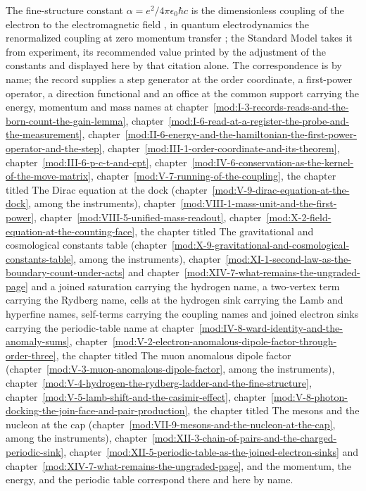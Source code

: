 \begin{chbridge}
The fine-structure constant $\alpha = e^{2}/4\pi\epsilon_{0}\hbar c$ is the dimensionless coupling of the electron to the electromagnetic field \cite{Sommerfeld1916}, in quantum electrodynamics the renormalized coupling at zero momentum transfer \cite{Peskin1995}; the Standard Model takes it from experiment, its recommended value printed by the adjustment of the constants \cite{Mohr2025} and displayed here by that citation alone. The correspondence is by name; the record supplies a step generator at the order coordinate, a first-power operator, a direction functional and an office at the common support carrying the energy, momentum and mass names at chapter~\ref{mod:I-3-records-reads-and-the-born-count-the-gain-lemma}, chapter~\ref{mod:I-6-read-at-a-register-the-probe-and-the-measurement}, chapter~\ref{mod:II-6-energy-and-the-hamiltonian-the-first-power-operator-and-the-step}, chapter~\ref{mod:III-1-order-coordinate-and-its-theorem}, chapter~\ref{mod:III-6-p-c-t-and-cpt}, chapter~\ref{mod:IV-6-conservation-as-the-kernel-of-the-move-matrix}, chapter~\ref{mod:V-7-running-of-the-coupling}, the chapter titled The Dirac equation at the dock (chapter~\ref{mod:V-9-dirac-equation-at-the-dock}, among the instruments), chapter~\ref{mod:VIII-1-mass-unit-and-the-first-power}, chapter~\ref{mod:VIII-5-unified-mass-readout}, chapter~\ref{mod:X-2-field-equation-at-the-counting-face}, the chapter titled The gravitational and cosmological constants table (chapter~\ref{mod:X-9-gravitational-and-cosmological-constants-table}, among the instruments), chapter~\ref{mod:XI-1-second-law-as-the-boundary-count-under-acts} and chapter~\ref{mod:XIV-7-what-remains-the-ungraded-page} and a joined saturation carrying the hydrogen name, a two-vertex term carrying the Rydberg name, cells at the hydrogen sink carrying the Lamb and hyperfine names, self-terms carrying the coupling names and joined electron sinks carrying the periodic-table name at chapter~\ref{mod:IV-8-ward-identity-and-the-anomaly-sums}, chapter~\ref{mod:V-2-electron-anomalous-dipole-factor-through-order-three}, the chapter titled The muon anomalous dipole factor (chapter~\ref{mod:V-3-muon-anomalous-dipole-factor}, among the instruments), chapter~\ref{mod:V-4-hydrogen-the-rydberg-ladder-and-the-fine-structure}, chapter~\ref{mod:V-5-lamb-shift-and-the-casimir-effect}, chapter~\ref{mod:V-8-photon-docking-the-join-face-and-pair-production}, the chapter titled The mesons and the nucleon at the cap (chapter~\ref{mod:VII-9-mesons-and-the-nucleon-at-the-cap}, among the instruments), chapter~\ref{mod:XII-3-chain-of-pairs-and-the-charged-periodic-sink}, chapter~\ref{mod:XII-5-periodic-table-as-the-joined-electron-sinks} and chapter~\ref{mod:XIV-7-what-remains-the-ungraded-page}, and the momentum, the energy, and the periodic table correspond there and here by name.
\end{chbridge}

